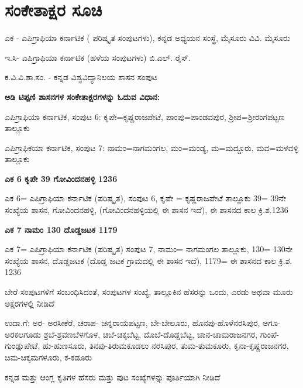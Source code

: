 
\chapter*{ಸಂಕೇತಾಕ್ಷರ ಸೂಚಿ}

ಎಕ - ಎಪಿಗ್ರಾಫಿಯಾ ಕರ್ನಾಟಿಕ ( ಪರಿಷ್ಕೃತ ಸಂಪುಟಗಳು), ಕನ್ನಡ ಅಧ್ಯಯನ ಸಂಸ್ಥೆ, ಮೈಸೂರು ವಿವಿ. ಮೈಸೂರು

ಇ.ಸಿ- ಎಪಿಗ್ರಾಫಿಯಾ ಕರ್ನಾಟಿಕ (ಹಳೆಯ ಸಂಪುಟಗಳು) ಬಿ.ಎಲ್​. ರೈಸ್​.

ಕ.ವಿ.ವಿ.ಶಾ.ಸಂ. - ಕನ್ನಡ ವಿಶ್ವವಿದ್ಯಾನಿಲಯ ಶಾಸನ ಸಂಪುಟ

\textbf{ಅಡಿ ಟಿಪ್ಪಣಿ ಶಾಸನಗಳ ಸಂಕೇತಾಕ್ಷರಗಳನ್ನು ಓದುವ ವಿಧಾನ:}

ಎಪಿಗ್ರಾಫಿಯಾ ಕರ್ನಾಟಿಕ, ಸಂಪುಟ 6: ಕೃಪೇ=ಕೃಷ್ಣರಾಜಪೇಟೆ, ಪಾಂಪು=ಪಾಂಡವಪುರ, ಶ‍್ರೀಪ=ಶ‍್ರೀರಂಗಪಟ್ಟಣ ತಾಲ್ಲೂಕು

ಎಪಿಗ್ರಾಫಿಕಯಾ ಕರ್ನಾಟಿಕ, ಸಂಪುಟ 7: ನಾಮಂ=ನಾಗಮಂಗಲ, ಮಂ=ಮಂಡ್ಯ, ಮ=ಮದ್ದೂರು, ಮವ=ಮಳವಳ್ಳಿ ತಾಲ್ಲೂಕು

\textbf{ಎಕ 6 ಕೃಪೇ 39 ಗೋವಿಂದನಹಳ್ಳಿ 1236}

ಎಕ 6= ಎಪಿಗ್ರಾಫಿಯಾ ಕರ್ನಾಟಿಕ (ಪರಿಷ್ಕೃತ), ಸಂಪುಟ 6, ಕೃಪೇ = ಕೃಷ್ಣರಾಜಪೇಟೆ ತಾಲ್ಲೂಕು 39= 39ನೇ ಸಂಖ್ಯೆಯ ಶಾಸನ, ಗೋವಿಂದನಹಳ್ಳಿ, (ಗೋವಿಂದನಹಳ್ಳಿಯಲ್ಲಿ ಈ ಶಾಸನ ಇದೆ), ಈ ಶಾಸನದ ಕಾಲ ಕ್ರಿ.ಶ.1236

\textbf{ಎಕ 7 ನಾಮಂ 130 ದೊಡ್ಡಜಟಕ 1179}

ಎಕ 7= ಎಪಿಗ್ರಾಫಿಯಾ ಕರ್ನಾಟಿಕ (ಪರಿಷ್ಕೃತ) ಸಂಪುಟ 7, ನಾಮಂ= ನಾಗಮಂಗಲ ತಾಲ್ಲೂಕು, 130= 130ನೇ ಸಂಖ್ಯೆಯ ಶಾಸನ, ದೊಡ್ಡಜಟಕ (ದೊಡ್ಡ ಜಟಕ ಗ್ರಾಮದಲ್ಲಿ ಈ ಶಾಸನ ಇದೆ), 1179= ಈ ಶಾಸನದ ಕಾಲ ಕ್ರಿ.ಶ. 1236

ಬೇರೆ ಸಂಪುಟಗಳಿಗೆ ಸಂಬಂಧಿಸಿದಂತೆ, ಸಂಪುಟಗಳ ಸಂಖ್ಯೆ, ತಾಲ್ಲೂಕಿನ ಹೆಸರನ್ನು ಒಂದು, ಎರಡು ಅಥವಾ ಮೂರು ಅಕ್ಷರಗಳಲ್ಲಿ ನೀಡಿದೆ

ಉದಾ.ಗೆ: ಅರ- ಅರಸೀಕೆರೆ, ಚರಾಪ- ಚನ್ನರಾಯಪಟ್ಟಣ, ಬೇ-ಬೇಲೂರು, ಹೊನಪು-ಹೊಳೆನರಸಿಪುರ, ಅಗೂ-ಅರಕಲಗೂಡು ಶ್ರಬೆ-ಶ್ರವಣಬೆಳಗೊಳ, ಚಿಬೆ-ಚಿಕ್ಕಬೆಟ್ಟ, ದೊಬೆ-ದೊಡ್ಡಬೆಟ್ಟ, ಚಾನ-ಚಾಮರಾಜನಗರ, ಗುಂಪೆ-ಗುಂಡ್ಲುಪೇಟೆ, ಹು-ಹುಣಸೂರು, ತಿನಪು-ತಿರುಮಕೂಡಲು ನರಸಿಪುರ, ತುಮ-ತುಮಕೂರು, ಕೃನಾ-ಕೃಷ್ಣರಾಜನಗರ, ಚಿಮ-ಚಿಕ್ಕಮಗಳೂರು, ಕ-ಕಡೂರು

ಕನ್ನಡ ಮತ್ತು ಆಂಗ್ಲ ಕೃತಿಗಳ ಹೆಸರು ಮತ್ತು ಪುಟ ಸಂಖ್ಯೆಗಳನ್ನು ಪೂರ್ತಿಯಾಗಿ ನೀಡಿದೆ

